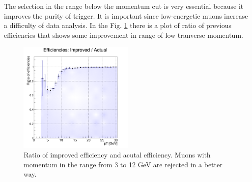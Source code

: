 The selection in the range below the momentum cut is very essential because it improves the purity of trigger.
It is important since low-energetic muons increase a difficulty of data analysis.
In the Fig. \ref{ratio} there is a plot of ratio of previous efficiencies that shows some improvement in range of low tranverse momentum.

\begin{figure}[ht]
\centering
\includegraphics[width=0.5\textwidth]{Ratio16.png}
\caption{Ratio of improved efficiency and acutal efficiency. Muons with momentum in the range from 3 to 12 GeV are rejected in a better way.}
\label{ratio}
\end{figure} 

